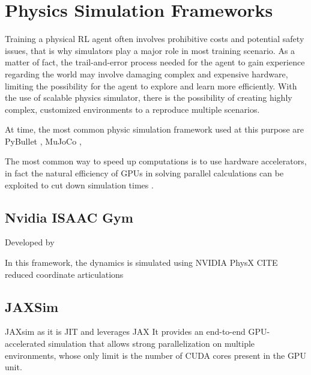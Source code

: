 \chapter{Physics Simulation Frameworks}
\label{chp:03-PhysicsSimulators}

Training a physical \ac{RL} agent often involves prohibitive costs and potential safety issues, that is why simulators play a major role in most training scenario. As a matter of fact, the trail-and-error process needed for the agent to gain experience regarding the world may involve damaging complex and expensive hardware, limiting the possibility for the agent to explore and learn more efficiently.
With the use of scalable physics simulator, there is the possibility of creating highly complex, customized environments to a reproduce multiple scenarios.

At time, the most common physic simulation framework used at this purpose are PyBullet \cite{coumans_pybullet_2016}, MuJoCo \cite{todorov_mujoco_2012},

The most common way to speed up computations is to use hardware accelerators, in fact the natural efficiency of \ac{GPU}s in solving parallel calculations can be exploited to cut down simulation times \cite{liang_gpu-accelerated_2018}.

\section{Nvidia ISAAC Gym}

Developed by \cite{makoviychuk_isaac_2021}

In this framework, the dynamics is simulated using NVIDIA PhysX CITE reduced coordinate articulations
\section{JAXSim}


JAXsim \cite{ferigo_jaxsim_2022} as it is \ac{JIT} and leverages JAX \cite{bradbury_jax_2018}
It provides an end-to-end GPU-accelerated simulation that allows strong parallelization on multiple environments, whose only limit is the number of \ac{CUDA} cores present in the GPU unit.

